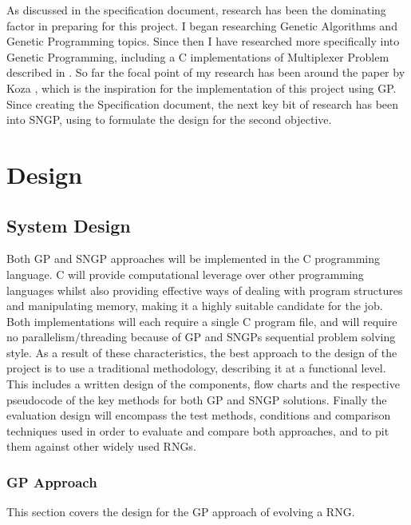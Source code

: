 \documentclass[a4paper,10.5pt]{article}
\begin{document}
As discussed in the specification document, research has been the dominating factor in preparing for this project. I began researching Genetic Algorithms \cite[p.1 - 24]{mitchell} and Genetic Programming \cite[p.1 - 35]{introgp} \cite[p.73 - 191]{kozagpbook} topics. Since then I have researched more specifically into Genetic Programming, including a C implementations of Multiplexer Problem described in \cite{kozamux}. So far the focal point of my research has been around the paper by Koza \cite{kozarng}, which is the inspiration for the implementation of this project using GP. Since creating the Specification document, the next key bit of research has been into SNGP, using \cite{jacksonsngp2} to formulate the design for the second objective. 

\section{Design}
\subsection{System Design}


Both GP and SNGP approaches will be implemented in the C programming language. C will provide computational leverage over other programming languages whilst also providing effective ways of dealing with program structures and manipulating memory, making it a highly suitable candidate for the job. Both implementations will each require a single C program file, and will require no parallelism/threading because of GP and SNGPs sequential problem solving style. As a result of these characteristics, the best approach to the design of the project is to use a traditional methodology, describing it at a functional level. This includes a written design of the components, flow charts and the respective pseudocode of the key methods for both GP and SNGP solutions. Finally the evaluation design will encompass the test methods, conditions and comparison techniques used in order to evaluate and compare both approaches, and to pit them against other widely used RNGs.

\subsubsection{GP Approach}
This section covers the design for the GP approach of evolving a RNG. 
\end{document}
